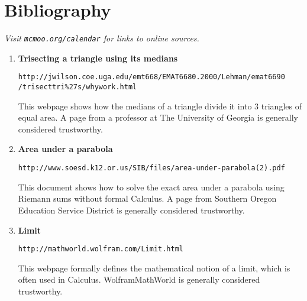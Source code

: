 \documentclass[letterpaper,12pt,twoside]{article}
\begin{document}
	\pagestyle{fancy}
	
		\section*{Bibliography} \textit{Visit \texttt{mcmoo.org/calendar} for links to online sources.}
	
	\vspace{1cm}
		\begin{enumerate}
			\item \textbf{Trisecting a triangle using its medians} \par\texttt{http://jwilson.coe.uga.edu/emt668/EMAT6680.2000/Lehman/emat6690\\/trisecttri\%27s/whywork.html}\par This webpage shows how the medians of a triangle divide it into 3 triangles of equal area. A page from a professor at The University of Georgia is generally considered trustworthy.
			
			\item \textbf{Area under a parabola}
			\par\texttt{http://www.soesd.k12.or.us/SIB/files/area-under-parabola(2).pdf}\par This document shows how to solve the exact area under a parabola using Riemann sums without formal Calculus. A page from Southern Oregon Education Service District is generally considered trustworthy.
			
			\item \textbf{Limit}
			\par\texttt{http://mathworld.wolfram.com/Limit.html}\par This webpage formally defines the mathematical notion of a limit, which is often used in Calculus. WolframMathWorld is generally considered trustworthy.
		\end{enumerate}
\end{document}
